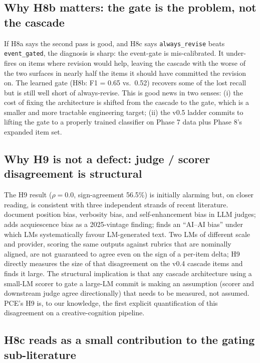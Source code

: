 \subsection{Why H8b matters: the gate is the problem, not the cascade}

If H8a says the second pass is good, and H8c says \texttt{always\_revise} beats \texttt{event\_gated}, the diagnosis is sharp: the  event-gate is mis-calibrated. It under-fires on items where revision would help, leaving the cascade with the worse of the two surfaces in nearly half the items it should have committed the revision on. The learned gate (H8b: F1 = 0.65 vs.\ 0.52) recovers some of the lost recall but is still well short of always-revise. This is good news in two senses: (i) the cost of fixing the architecture is shifted from the cascade to the gate, which is a smaller and more tractable engineering target; (ii) the v0.5 ladder commits to lifting the gate to a properly trained classifier on Phase 7 data plus Phase 8's expanded item set.

\subsection{Why H9 is not a defect: judge / scorer disagreement is structural}

The H9 result ($\rho=0.0$, sign-agreement 56.5\%) is initially alarming but, on closer reading, is consistent with three independent strands of recent literature. \citet{ZhengEtAl2023JudgingLLMAsJudge} document position bias, verbosity bias, and self-enhancement bias in LLM judges; \citet{Braun2025AcquiescenceBiasLLMs} adds acquiescence bias as a 2025-vintage finding; \citet{LauritoEtAl2025PNASAIAIBias} finds an ``AI--AI bias'' under which LMs systematically favour LM-generated text. Two LMs of different scale and provider, scoring the same outputs against rubrics that are nominally aligned, are not guaranteed to agree even on the sign of a per-item delta; H9 directly measures the size of that disagreement on the v0.4 cascade items and finds it large. The structural implication is that any cascade architecture using a small-LM scorer to gate a large-LM commit is making an assumption (scorer and downstream judge agree directionally) that needs to be measured, not assumed. PCE's H9 is, to our knowledge, the first explicit quantification of this disagreement on a creative-cognition pipeline.

\subsection{H8c reads as a small contribution to the gating sub-literature}

